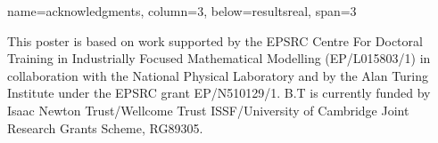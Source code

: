 \documentclass[a0paper,portrait,fontscale=0.35]{baposter}
\theoremstyle{plain}
\theoremstyle{plain}
\theoremstyle{definition}
\theoremstyle{plain}
\theoremstyle{definition}
\begin{document}
\begin{poster}
{name=acknowledgments, column=3, below=resultsreal, span=3}
{  
  \scriptsize
  This poster is based on work supported by 
  the EPSRC Centre For Doctoral Training in Industrially Focused Mathematical 
  Modelling (EP/L015803/1) in collaboration with the National Physical Laboratory 
  and by the Alan Turing Institute under the EPSRC grant EP/N510129/1.
  B.T is currently funded by  
  Isaac Newton Trust/Wellcome Trust ISSF/University of Cambridge 
  Joint Research Grants Scheme, RG89305.
  \par
}






\end{poster}
\end{document}
